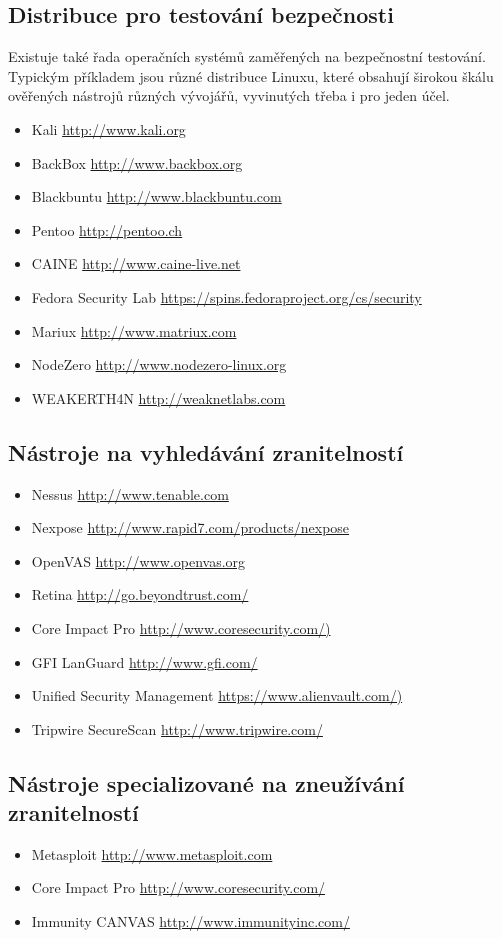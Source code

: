 \documentclass{article}
\begin{document}
\subsection{Distribuce pro testování bezpečnosti}
Existuje také řada operačních systémů zaměřených
na bezpečnostní testování. Typickým příkladem jsou různé distribuce Linuxu, které obsahují
širokou škálu ověřených nástrojů různých vývojářů, vyvinutých třeba i pro jeden účel.
\begin{itemize}
    \item Kali \url{http://www.kali.org}
    \item BackBox \url{http://www.backbox.org}
    \item Blackbuntu \url{http://www.blackbuntu.com}
    \item Pentoo \url{http://pentoo.ch}
    \item CAINE \url{http://www.caine-live.net}
    \item Fedora Security Lab \url{https://spins.fedoraproject.org/cs/security}
    \item Mariux \url{http://www.matriux.com}
    \item NodeZero \url{http://www.nodezero-linux.org}
    \item WEAKERTH4N \url{http://weaknetlabs.com}
\end{itemize}
\subsection{Nástroje na vyhledávání zranitelností}
\begin{itemize}
    \item Nessus \url{http://www.tenable.com}
    \item Nexpose \url{http://www.rapid7.com/products/nexpose}
    \item OpenVAS \url{http://www.openvas.org}
    \item Retina \url{http://go.beyondtrust.com/}
    \item Core Impact Pro \url{http://www.coresecurity.com/)}
    \item GFI LanGuard  \url{http://www.gfi.com/}
    \item Unified Security Management \url{https://www.alienvault.com/)}
    \item Tripwire SecureScan  \url{http://www.tripwire.com/}
\end{itemize}
\subsection{Nástroje specializované na zneužívání zranitelností}
\begin{itemize}
    \item Metasploit \url{http://www.metasploit.com}
    \item Core Impact Pro  \url{http://www.coresecurity.com/}
    \item Immunity CANVAS  \url{http://www.immunityinc.com/}
\end{itemize}
\end{document}
